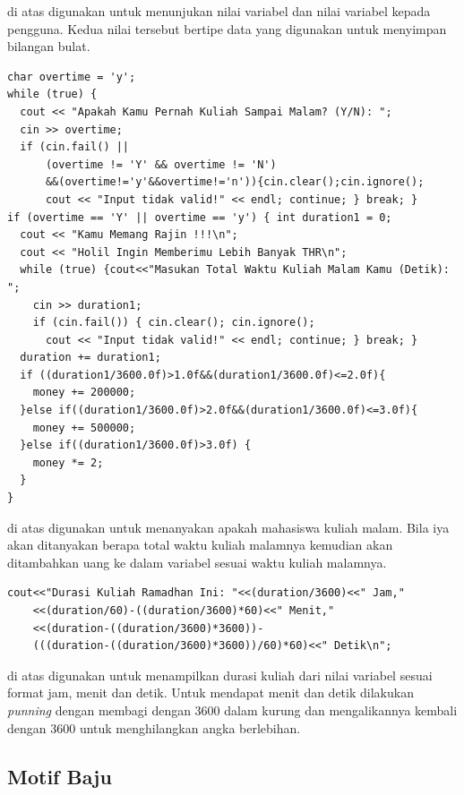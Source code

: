 \documentclass[../main.tex]{subfiles}
\begin{document}
    {\Script} di atas digunakan untuk menunjukan nilai variabel  dan nilai variabel  kepada pengguna. Kedua nilai tersebut bertipe data  yang digunakan untuk menyimpan bilangan bulat.

\begin{code}
\begin{verbatim}
char overtime = 'y';
while (true) {
  cout << "Apakah Kamu Pernah Kuliah Sampai Malam? (Y/N): ";
  cin >> overtime;
  if (cin.fail() ||
      (overtime != 'Y' && overtime != 'N')
      &&(overtime!='y'&&overtime!='n')){cin.clear();cin.ignore();
      cout << "Input tidak valid!" << endl; continue; } break; }
if (overtime == 'Y' || overtime == 'y') { int duration1 = 0;
  cout << "Kamu Memang Rajin !!!\n";
  cout << "Holil Ingin Memberimu Lebih Banyak THR\n";
  while (true) {cout<<"Masukan Total Waktu Kuliah Malam Kamu (Detik): ";
    cin >> duration1;
    if (cin.fail()) { cin.clear(); cin.ignore();
      cout << "Input tidak valid!" << endl; continue; } break; }
  duration += duration1;
  if ((duration1/3600.0f)>1.0f&&(duration1/3600.0f)<=2.0f){
    money += 200000;
  }else if((duration1/3600.0f)>2.0f&&(duration1/3600.0f)<=3.0f){
    money += 500000;
  }else if((duration1/3600.0f)>3.0f) {
    money *= 2;
  }
}
\end{verbatim}
\end{code}

{\Script} di atas digunakan untuk menanyakan apakah mahasiswa kuliah malam. Bila iya akan ditanyakan berapa total waktu kuliah malamnya kemudian akan ditambahkan uang ke dalam variabel  sesuai waktu kuliah malamnya.

\begin{code}
\begin{verbatim}
cout<<"Durasi Kuliah Ramadhan Ini: "<<(duration/3600)<<" Jam,"
    <<(duration/60)-((duration/3600)*60)<<" Menit,"
    <<(duration-((duration/3600)*3600))-
    (((duration-((duration/3600)*3600))/60)*60)<<" Detik\n";
\end{verbatim}
\end{code}

{\Script} di atas digunakan untuk menampilkan durasi kuliah dari nilai variabel  sesuai format jam, menit dan detik. Untuk mendapat menit dan detik dilakukan {\type} \textit{punning} dengan membagi  dengan 3600 dalam kurung dan mengalikannya kembali dengan 3600 untuk menghilangkan angka berlebihan.

\subsection{Motif Baju}
\end{document}

